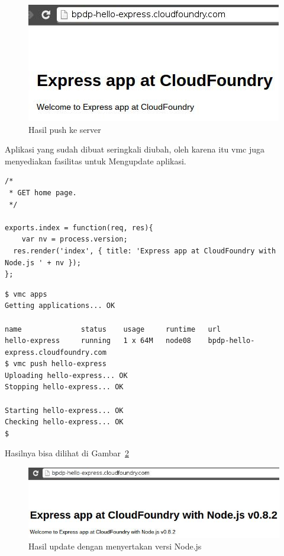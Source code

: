   \begin{figure}
    \begin{center}
      \includegraphics[scale=0.5]{images/bpdp-hello-express.jpg}
    \end{center}
    \caption{Hasil push ke server}
    \label{fig:modul1-hello}
  \end{figure}

Aplikasi yang sudah dibuat seringkali diubah, oleh karena itu vmc juga menyediakan fasilitas untuk Mengupdate aplikasi. 

\lstset{language=Javascript,caption=Update: menambahkan versi Node.js ke routes/index.js}
\begin{lstlisting}
/*
 * GET home page.
 */

exports.index = function(req, res){
	var nv = process.version;
  res.render('index', { title: 'Express app at CloudFoundry with Node.js ' + nv });
};
\end{lstlisting}

\lstset{language=bash,caption=Mengupdate aplikasi di server}
\begin{lstlisting}
$ vmc apps
Getting applications... OK

name              status    usage     runtime   url                                      
hello-express     running   1 x 64M   node08    bpdp-hello-express.cloudfoundry.com      
$ vmc push hello-express
Uploading hello-express... OK
Stopping hello-express... OK

Starting hello-express... OK
Checking hello-express... OK
$ 
\end{lstlisting}

Hasilnya bisa dilihat di Gambar~\ref{fig:modul1-hello-update}

  \begin{figure}
    \begin{center}
      \includegraphics[scale=0.5]{images/bpdp-hello-express-update.jpg}
    \end{center}
    \caption{Hasil update dengan menyertakan versi Node.js}
    \label{fig:modul1-hello-update}
  \end{figure}

